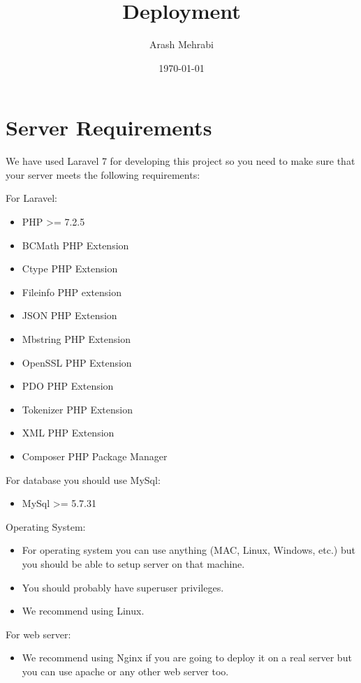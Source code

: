 \documentclass[12pt]{article}
\title{Deployment}
\date{\today}
\author{Arash Mehrabi}
\begin{document}
\begin{titlepage}
\maketitle
\end{titlepage}

\section{Server Requirements}
We have used Laravel 7 for developing this project so you need to make sure that your server meets the following requirements:

\noindent For Laravel:
\begin{itemize}
    \item PHP \textgreater = 7.2.5
    \item BCMath PHP Extension
    \item Ctype PHP Extension
    \item Fileinfo PHP extension
    \item JSON PHP Extension
    \item Mbstring PHP Extension
    \item OpenSSL PHP Extension
    \item PDO PHP Extension
    \item Tokenizer PHP Extension
    \item XML PHP Extension
    \item Composer PHP Package Manager
\end{itemize}

\noindent For database you should use MySql:
\begin{itemize}
    \item MySql \textgreater = 5.7.31
\end{itemize}

\noindent Operating System:
\begin{itemize}
    \item For operating system you can use anything (MAC, Linux, Windows, etc.) but you should be able to setup server on that machine.
    \item You should probably have superuser privileges.
    \item We recommend using Linux.
\end{itemize}
\noindent For web server:
\begin{itemize}
    \item We recommend using Nginx if you are going to deploy it on a real server but you can use apache or any other web server too.
\end{itemize}
\end{document}
